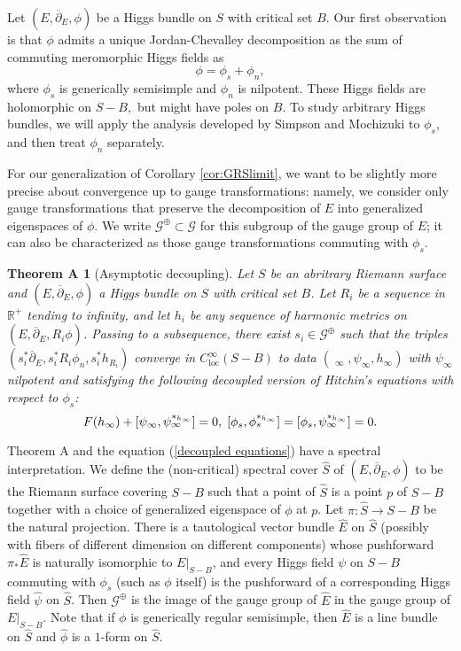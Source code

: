 \documentclass[10pt]{amsart}
\newcommand{\R}{\mathbb R}
\DeclareMathOperator{\dbar}{\overline{\partial}}
\newtheorem*{thma}{Theorem A}
\theoremstyle{definition}
\begin{document}
Let $(E,\overline{\partial}_E,\phi)$ be a Higgs bundle on $S$ with critical set $B$. Our first observation is that $\phi$ admits a unique Jordan-Chevalley decomposition as the sum of commuting meromorphic Higgs fields as $$\phi=\phi_s+\phi_n,$$
where $\phi_s$ is generically semisimple and $\phi_n$ is nilpotent. These Higgs fields are holomorphic on $S-B,$ but might have poles on $B.$ To study arbitrary Higgs bundles, we will apply the analysis developed by Simpson and Mochizuki to $\phi_s$, and then treat $\phi_n$ separately. 

For our generalization of Corollary \ref{cor:GRSlimit}, we want to be slightly more precise about convergence up to gauge transformations: namely, we consider only gauge transformations that preserve the decomposition of $E$ into generalized eigenspaces of $\phi$. We write $\mathcal{G}^\oplus\subset \mathcal{G}$ for this subgroup of the gauge group of $E$; it can also be characterized as those gauge transformations commuting with $\phi_s$.

\begin{thma}[Asymptotic decoupling]
Let $S$ be an abritrary Riemann surface and  $(E,\overline{\partial}_E,\phi)$ a Higgs bundle on $S$ with critical set $B$. Let $R_i$ be a sequence in $\R^+$ tending to infinity, and let $h_i$ be any sequence of harmonic metrics on $(E,\overline{\partial}_E,R_i\phi)$. 
Passing to a subsequence, there exist $s_i \in \mathcal{G}^\oplus$ such that the triples $(s_i^*\overline{\partial}_E,  s_i^* R_i \phi_n, s_i^* h_{R_i})$ converge in $C^\infty_{\mathrm{loc}}(S - B)$ to data $(\dbar_\infty, \psi_\infty, h_\infty)$ with $\psi_\infty$ nilpotent and satisfying the following decoupled version of Hitchin's equations with respect to $\phi_s$:
\begin{equation} \label{decoupled equations}
    F(h_\infty) + [\psi_\infty,\psi_\infty^{*_{h_\infty}}]=0, \hspace{1mm} [\phi_s,\phi_s^{*_{h_{\infty}}}] =[\phi_s,\psi_\infty^{*_{h_\infty}}]=0.
\end{equation}
\end{thma}


Theorem A and the equation (\ref{decoupled equations}) have a spectral interpretation. We define the (non-critical) spectral cover $\hat{S}$ of $(E,\overline{\partial}_E,\phi)$ to be the Riemann surface covering $S-B$ such that a point of $\hat{S}$ is a point $p$ of $S-B$ together with a choice of generalized eigenspace of $\phi$ at $p$.  Let $\pi: \hat{S} \to S-B$ be the natural projection. There is a tautological vector bundle $\hat{E}$ on $\hat{S}$ (possibly with fibers of different dimension on different components) whose pushforward $\pi_*\hat{E}$ is naturally isomorphic to $E|_{S-B}$, and every Higgs field $\psi$ on $S-B$ commuting with $\phi_s$ (such as $\phi$ itself) is the pushforward of a corresponding Higgs field $\hat{\psi}$ on $\hat{S}$. Then $\mathcal{G}^\oplus$ is the image of the gauge group of $\hat{E}$ in the gauge group of $E|_{S-B}$.
Note that if $\phi$ is generically regular semisimple, then $\hat{E}$ is a line bundle on $\hat{S}$ and $\hat{\phi}$ is a $1$-form on $\hat{S}$.
\end{document}
